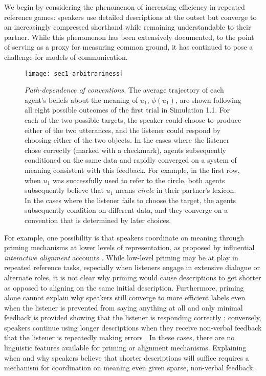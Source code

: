 We begin by considering the phenomenon of increasing efficiency in repeated reference games: speakers use detailed descriptions at the outset but converge to an increasingly compressed shorthand while remaining understandable to their partner.
While this phenomenon has been extensively documented, to the point of serving as a proxy for measuring common ground, it has continued to pose a challenge for models of communication.

  \begin{figure*}
\centering
    \texttt{[image: sec1-arbitrariness]}
    \vspace{1em}
    \caption{\emph{Path-dependence of conventions.} The average trajectory of each agent's beliefs about the meaning of $u_1$, $\phi(u_1)$, are shown following all eight possible outcomes of the first trial in Simulation 1.1. For each of the two possible targets, the speaker could choose to produce either of the two utterances, and the listener could respond by choosing either of the two objects. In the cases where the listener chose correctly (marked with a checkmark), agents subsequently conditioned on the same data and rapidly converged on a system of meaning consistent with this feedback. For example, in the first row, when $u_1$ was successfully used to refer to the circle, both agents subsequently believe that $u_1$ means \emph{circle} in their partner's lexicon. In the cases where the listener fails to choose the target, the agents subsequently condition on different data, and they converge on a convention that is determined by later choices. }
  \label{fig:path-dependence}
\end{figure*}

For example, one possibility is that speakers coordinate on meaning through priming mechanisms at lower levels of representation, as proposed by influential  \emph{interactive alignment} accounts \cite{pickering2004toward, pickering2006alignment, garrod2009joint}.
While low-level priming may be at play in repeated reference tasks, especially when listeners engage in extensive dialogue or alternate roles, it is not clear why priming would cause descriptions to get shorter as opposed to aligning on the same initial description.
Furthermore, priming alone cannot explain why speakers still converge to more efficient labels even when the listener is prevented from saying anything at all and only minimal feedback is provided showing that the listener is responding correctly \cite{KraussWeinheimer66_Tangrams}; conversely, speakers continue using longer descriptions when they receive non-verbal feedback that the listener is repeatedly making errors \cite<see also>{hawkins2020characterizing}.
In these cases, there are no linguistic features available for priming or alignment mechanisms.
Explaining when and why speakers believe that shorter descriptions will suffice requires a mechanism for coordination on meaning even given sparse, non-verbal feedback.


